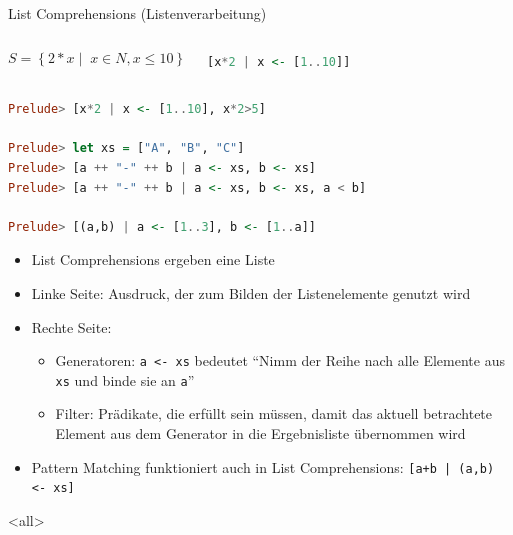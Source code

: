 \documentclass[svgnames,smaller,ngerman]{beamer}
\newcommand{\bsp}[1]{\vfill\hfill\beamerbutton{#1}}
\begin{document}
\begin{frame}[fragile]{List Comprehensions (Listenverarbeitung)}
    \begin{columns}

    $$
    S = \left\{ 2*x \;|\;\; x \in N, x \le 10 \right\}
    $$

    \pause
    \bigskip
    \medskip

    \begin{small}
    \begin{lstlisting}[language=Haskell]
[x*2 | x <- [1..10]]
    \end{lstlisting}
    \end{small}

    \end{columns}

    \pause
    \bigskip
    \bigskip
    \bigskip
    \begin{lstlisting}[language=Haskell]
Prelude> [x*2 | x <- [1..10], x*2>5]

Prelude> let xs = ["A", "B", "C"]
Prelude> [a ++ "-" ++ b | a <- xs, b <- xs]
Prelude> [a ++ "-" ++ b | a <- xs, b <- xs, a < b]

Prelude> [(a,b) | a <- [1..3], b <- [1..a]]
    \end{lstlisting}

    \begin{itemize}
        \item List Comprehensions ergeben eine Liste
        \item Linke Seite: Ausdruck, der zum Bilden der Listenelemente genutzt
              wird
        \item Rechte Seite:
        \begin{itemize}
            \item Generatoren: \verb/a <- xs/ bedeutet \enquote{Nimm der Reihe
                  nach alle Elemente aus \texttt{xs} und binde sie an
                  \texttt{a}}
            \item Filter: Prädikate, die erfüllt sein müssen, damit das aktuell
                  betrachtete Element aus dem Generator in die Ergebnisliste
                  übernommen wird
        \end{itemize}
        \item Pattern Matching funktioniert auch in List Comprehensions:
              \verb/[a+b | (a,b) <- xs]/
    \end{itemize}
    \mode<all>

    \bsp{ghci}
\end{frame}
\end{document}
